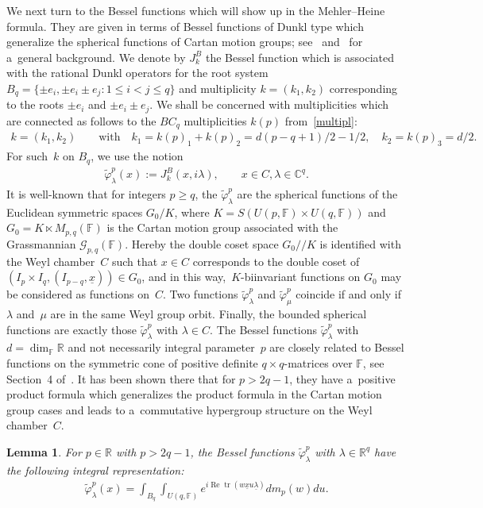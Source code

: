 \documentclass[11pt]{article}
\numberwithin{equation}{section}
\newtheorem{Lemma}[Theorem]{Lemma}
\DeclareMathOperator{\Ree}{Re}
\begin{document}
We next turn to the Bessel functions which will show up in the Mehler--Heine formula.
They are given in terms of Bessel functions of Dunkl type which generalize the spherical functions of Cartan motion
groups; see~\cite{dJ} and~\cite{O} for a~general background.
We denote by $J_k^B$ the Bessel function which is associated with the rational Dunkl operators for the root system $B_q=
\{\pm e_i, \pm e_i \pm e_j: 1\leq i< j \leq q\}$ and multiplicity $k=(k_1, k_2)$ corresponding to the roots $\pm e_i$
and $\pm e_i \pm e_j$.
We shall be concerned with multiplicities which are connected as follows to the $BC_q$ multiplicities $k(p)$
from~\eqref{multipl}:
\begin{gather*}
k= (k_1, k_2)
\qquad
\text{with}
\quad
k_1=k(p)_1+k(p)_2=d(p-q+1)/2-1/2,
\quad
k_2=k(p)_3=d/2.
\end{gather*}
For such~$k$ on $B_q$, we use the notion
\begin{gather*}
\widetilde\varphi_\lambda^{p}(x):=J_k^B(x, i\lambda),
\qquad
x\in C, \lambda \in \mathbb C^q.
\end{gather*}
It is well-known that for integers $p\geq q$, the $\widetilde\varphi_\lambda^{p}$ are the spherical functions of the
Euclidean symmetric spaces $G_0/K$, where $K=S(U(p,\mathbb F)\times U(q,\mathbb F))$ and $G_0= K\ltimes M_{p,q}(\mathbb F)$
is the Cartan motion group associated with the Grassmannian $\mathcal G_{p,q}(\mathbb F)$. Hereby the double coset
space $G_0//K$ is identif\/ied with the Weyl chamber~$C$ such that $x\in C$ corresponds to the double coset of $(I_p\times
I_q, (I_{p-q},\underline x) ) \in G_0$, and in this way,~$K$-biinvariant functions on $G_0$ may be considered as
functions on~$C$.
Two functions $\widetilde\varphi_\lambda^{p}$ and $\widetilde\varphi_\mu^{p}$ coincide if and only if~$\lambda$
and~$\mu$ are in the same Weyl group orbit.
Finally, the bounded spherical functions are exactly those $\widetilde\varphi_\lambda^{p}$ with $\lambda\in C$.
The Bessel functions $\widetilde\varphi_\lambda^{p}$ with $d=\dim_\mathbb F\mathbb R$ and not necessarily
integral parameter~$p$ are closely related to Bessel functions on the symmetric cone of positive def\/inite $q\times
q$-matrices over $\mathbb F$, see Section~4 of~\cite{R1}.
It has been shown there that for $p>2q-1$, they have a~positive product formula which generalizes the product formula in
the Cartan motion group cases and leads to a~commutative hypergroup structure on the Weyl chamber~$C$.

\begin{Lemma}
\label{Bessel-inte}
For $p\in \mathbb R$ with $p>2q-1$, the Bessel functions $\widetilde\varphi_\lambda^{p}$ with $\lambda \in \mathbb R^q$
have the following integral representation:
\begin{gather}
\label{int-rep-Bessel}
\widetilde\varphi_\lambda^{p}(x)=\int_{B_q}\int_{U(q,\mathbb F)} e^{i\Ree \operatorname{tr}(w \underline x u \underline\lambda)}dm_p(w)du.
\end{gather}
\end{Lemma}
\end{document}
